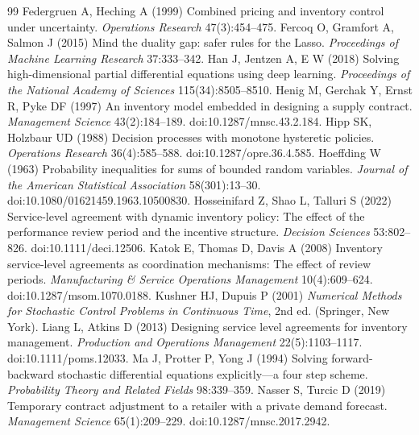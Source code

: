 \documentclass[11pt,letterpaper]{article}
\theoremstyle{definition}
\newcommand{\1}{\mathbf 1}
\begin{document}
\begin{thebibliography}{99}
Federgruen A, Heching A (1999) Combined pricing and inventory control under uncertainty. \emph{Operations Research} 47(3):454--475.
Fercoq O, Gramfort A, Salmon J (2015) Mind the duality gap: safer rules for the Lasso. \emph{Proceedings of Machine Learning Research} 37:333--342.
Han J, Jentzen A, E W (2018) Solving high-dimensional partial differential equations using deep learning. \emph{Proceedings of the National Academy of Sciences} 115(34):8505--8510.
Henig M, Gerchak Y, Ernst R, Pyke DF (1997) An inventory model embedded in designing a supply contract. \emph{Management Science} 43(2):184--189. doi:10.1287/mnsc.43.2.184.
Hipp SK, Holzbaur UD (1988) Decision processes with monotone hysteretic policies. \emph{Operations Research} 36(4):585--588. doi:10.1287/opre.36.4.585.
Hoeffding W (1963) Probability inequalities for sums of bounded random variables. \emph{Journal of the American Statistical Association} 58(301):13--30. doi:10.1080/01621459.1963.10500830.
Hosseinifard Z, Shao L, Talluri S (2022) Service-level agreement with dynamic inventory policy: The effect of the performance review period and the incentive structure. \emph{Decision Sciences} 53:802--826. doi:10.1111/deci.12506.
Katok E, Thomas D, Davis A (2008) Inventory service-level agreements as coordination mechanisms: The effect of review periods. \emph{Manufacturing \& Service Operations Management} 10(4):609--624. doi:10.1287/msom.1070.0188.
Kushner HJ, Dupuis P (2001) \emph{Numerical Methods for Stochastic Control Problems in Continuous Time}, 2nd ed. (Springer, New York).
Liang L, Atkins D (2013) Designing service level agreements for inventory management. \emph{Production and Operations Management} 22(5):1103--1117. doi:10.1111/poms.12033.
Ma J, Protter P, Yong J (1994) Solving forward-backward stochastic differential equations explicitly---a four step scheme. \emph{Probability Theory and Related Fields} 98:339--359.
Nasser S, Turcic D (2019) Temporary contract adjustment to a retailer with a private demand forecast. \emph{Management Science} 65(1):209--229. doi:10.1287/mnsc.2017.2942.


\end{thebibliography}
\end{document}
